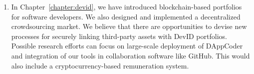\begin{enumerate}
	\item In Chapter~\ref{chapter:devid}, we have introduced blockchain-based portfolios for software developers.
	We also designed and implemented a decentralized crowdsourcing market.
	We believe that there are opportunities to devise new processes for securely linking third-party assets with DevID portfolios.
	Possible research efforts can focus on large-scale deployment of DAppCoder and integration of our tools in collaboration software like GitHub.
	This would also include a cryptocurrency-based remuneration system.
\end{enumerate}